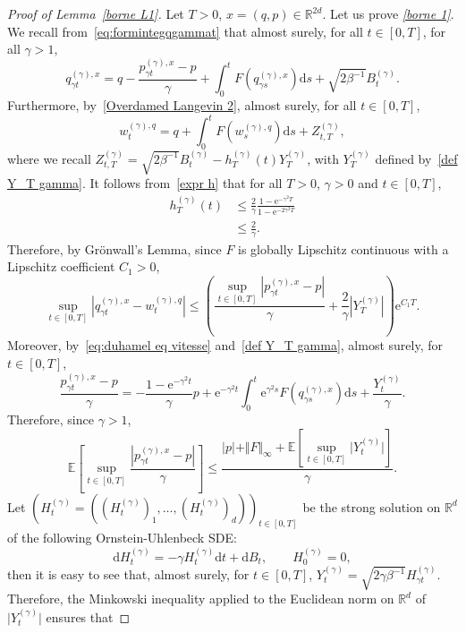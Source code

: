 \documentclass[preprint,EJP]{ejpecp}
\begin{document}
\begin{proof}[Proof of Lemma~\ref{borne L1}]
  
Let $T>0$, $x=(q,p)\in\mathbb{R}^{2d}$. Let us prove \emph{\eqref{borne 1}}. We recall from~\eqref{eq:formintegqgammat} that almost surely, for all $t\in[0,T]$, for all $\gamma>1$,
$$q^{(\gamma),x}_{\gamma t}=q-\frac{p^{(\gamma),x}_{\gamma t}-p}{\gamma}+\int_0^tF(q^{(\gamma),x}_{\gamma s}) \mathrm{d}s+\sqrt{2\beta^{-1}} B^{(\gamma)}_t .$$
Furthermore, by~\eqref{Overdamed Langevin 2}, almost surely, for all $t\in[0,T]$, 
$$w^{(\gamma),q}_{t}=q+\int_0^tF(w^{(\gamma),q}_{s}) \mathrm{d}s+Z_{t,T}^{(\gamma)},$$
where we recall $Z_{t,T}^{(\gamma)}=\sqrt{2\beta^{-1}} B^{(\gamma)}_t-h^{(\gamma)}_T(t) Y_T^{(\gamma)}$, with $Y_T^{(\gamma)}$ defined by~\eqref{def Y_T gamma}. It follows from~\eqref{expr h} that for all $T>0$, $\gamma>0$ and $t\in[0,T]$,
\begin{align*}
    h_T^{(\gamma)}(t) &\leq \frac{2}{\gamma} \frac{1-\mathrm{e}^{-\gamma^2T}}{1-\mathrm{e}^{-2\gamma^2T}}\\
    &\leq\frac{2}{\gamma}.
\end{align*}
Therefore, by Grönwall's Lemma, since $F$ is globally Lipschitz continuous with a Lipschitz coefficient $C_1>0$,
$$\sup_{t\in[0,T]}\left\vert q^{(\gamma),x}_{\gamma t}-w^{(\gamma),q}_{t}\right\vert\leq\left(\frac{\sup_{t\in[0,T]}\left\vert p^{(\gamma),x}_{\gamma t}-p\right\vert}{\gamma}+\frac{2}{\gamma} \left\vert Y_T^{(\gamma)}\right\vert\right) \mathrm{e}^{C_1 T} .$$
Moreover, by~\eqref{eq:duhamel eq vitesse} and~\eqref{def Y_T gamma}, almost surely, for $t\in[0,T]$,  
$$\frac{p^{(\gamma),x}_{\gamma t}-p}{\gamma}=-\frac{1-\mathrm{e}^{-\gamma^2 t}}{\gamma} p+\mathrm{e}^{-\gamma^2 t}\int_0^t\mathrm{e}^{\gamma^2 s} F(q^{(\gamma),x}_{\gamma s}) \mathrm{d}s+\frac{Y_t^{(\gamma)}}{\gamma}.$$
Therefore, since $\gamma>1$,
\begin{equation}\label{sup increment vitesse qsd}
    \mathbb{E}\left[\sup_{t\in[0,T]} \frac{\left\vert p^{(\gamma),x}_{\gamma t}-p\right\vert}{\gamma}\right]\leq \frac{\vert p\vert+\Vert F\Vert_\infty+\mathbb{E}\left[\sup_{t\in[0,T]} \vert Y_t^{(\gamma)}\vert\right]}{\gamma}.
\end{equation}
Let $(H^{(\gamma)}_t=((H^{(\gamma)}_t)_1,\dots,(H^{(\gamma)}_t)_d))_{t\in[0,T]}$ be the strong solution on $\mathbb{R}^d$ of the following Ornstein-Uhlenbeck SDE:
$$\mathrm{d}H^{(\gamma)}_t=-\gamma H^{(\gamma)}_t\mathrm{d}t+\mathrm{d}B_t, \qquad H^{(\gamma)}_0 = 0,$$
then it is easy to see that, almost surely, for $t\in[0,T]$, $Y^{(\gamma)}_t=\sqrt{2\gamma\beta^{-1}}H^{(\gamma)}_{\gamma t}$. Therefore, the Minkowski inequality applied to the Euclidean norm on $\mathbb{R}^d$ of $\vert Y_t^{(\gamma)}\vert$ ensures that

\end{proof}
\end{document}

